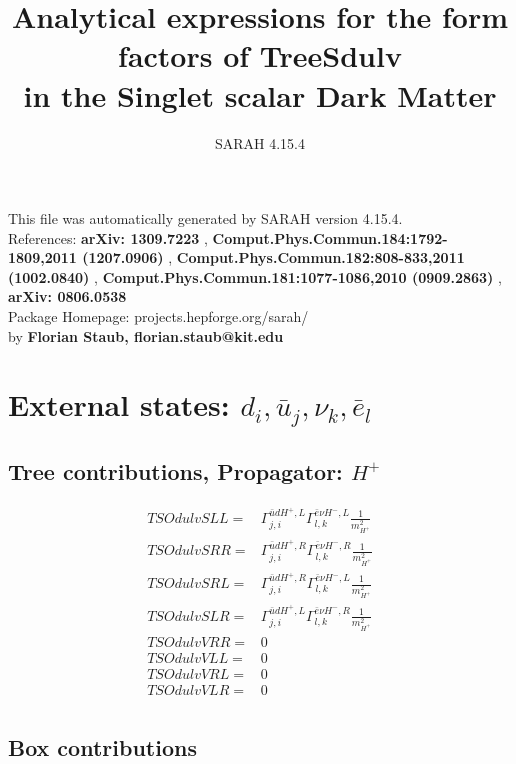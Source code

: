 \documentclass[A4,landscape]{article}
\begin{document}
\title{Analytical expressions for the form factors of TreeSdulv\\ in the Singlet scalar Dark Matter } 
 \author{SARAH 4.15.4} 
 \maketitle 
 \vspace{10cm} 
This file was automatically generated by SARAH version 4.15.4.  \\ 
References: {\bf arXiv: 1309.7223 }, {\bf Comput.Phys.Commun.184:1792-1809,2011 (1207.0906) }, {\bf Comput.Phys.Commun.182:808-833,2011 (1002.0840) }, {\bf Comput.Phys.Commun.181:1077-1086,2010 (0909.2863) }, {\bf arXiv: 0806.0538 } \\ 
Package Homepage: projects.hepforge.org/sarah/ \\ 
by {\bf Florian Staub, florian.staub@kit.edu} 
 \pagebreak 
 \tableofcontents 
 \pagebreak 
\section{External states: ${d_{{i}}, \bar{u}_{{j}}, \nu_{{k}}, \bar{e}_{{l}}}$} 
\subsection{Tree contributions, Propagator: $H^+$} 

\begin{align} 
  TSOdulvSLL= & \Gamma^{\bar{u}d H^+ ,L}_{j, i} \Gamma^{\bar{e}\nu H^-,L}_{l, k} \frac{1}{m^2_{H^+}} \\ 
  TSOdulvSRR= & \Gamma^{\bar{u}d H^+ ,R}_{j, i} \Gamma^{\bar{e}\nu H^-,R}_{l, k} \frac{1}{m^2_{H^+}} \\ 
  TSOdulvSRL= & \Gamma^{\bar{u}d H^+ ,R}_{j, i} \Gamma^{\bar{e}\nu H^-,L}_{l, k} \frac{1}{m^2_{H^+}} \\ 
  TSOdulvSLR= & \Gamma^{\bar{u}d H^+ ,L}_{j, i} \Gamma^{\bar{e}\nu H^-,R}_{l, k} \frac{1}{m^2_{H^+}} \\ 
  TSOdulvVRR= & 0 \\ 
  TSOdulvVLL= & 0 \\ 
  TSOdulvVRL= & 0 \\ 
  TSOdulvVLR= & 0 \\ 
\end{align} 
\subsection{Box contributions} 
\end{document}
